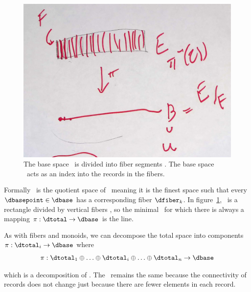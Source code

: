 \documentclass[../main.tex]{subfiles}
\begin{document}
\begin{figure}[H]
    \includegraphics[width=.5\linewidth]{figures/math/k_qspace.png}
    \caption{The base space \dtotal\ is divided into fiber segments \dfiber. The base space \dbase\ acts as an index into the records in the fibers.
    }
    \label{fig:base_space_div}
\end{figure}

Formally \dbase\ is the quotient space \cite{QuotientSpaceTopology2020} of \dtotal\, meaning it is the finest space\cite{aurouxMath131Introduction} such that every $\dbasepoint \in \dbase$ has a corresponding fiber $\dfiber_k$\cite{QuotientSpaceTopology2020}. In figure~\ref{fig:base_space_div}, \dtotal\ is a rectangle divided by vertical fibers \dfiber, so the minimal \dbase\ for which there is always a mapping $\pi: \dtotal\rightarrow \dbase$ is the line. 

As with fibers and monoids, we can decompose the total space into components $\pi:\dtotal_i\rightarrow \dbase$ where
\begin{equation}
    \pi:\dtotal_1\oplus\ldots\oplus \dtotal_i \oplus\ldots \oplus \dtotal_n \rightarrow \dbase
\end{equation}

which is a decomposition of \dfiber. The \dbase\ remains the same because the connectivity of records does not change just because there are fewer elements in each record.
\end{document}
